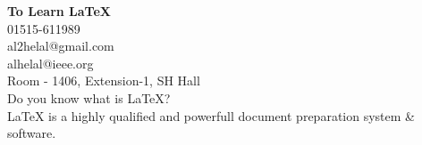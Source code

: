 \documentclass{article}
\begin{document}
\vspace*{\fill}
\begin{center}
 \LARGE{\textbf{To Learn \LaTeX{}}}
\\
\vspace{2cm}
 \faPhone{} 01515-611989\\
  \faEnvelope{} al2helal@gmail.com\\
  \faEnvelope{} alhelal@ieee.org\\
  \faHome{} Room - 1406, Extension-1, SH Hall
\\
\vspace{2cm}
Do you know what is \LaTeX{}?\\
  \LaTeX{} is a highly qualified and powerfull document preparation system \& software.
\end{center}
\vspace*{\fill}
 
\end{document}
